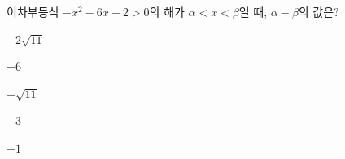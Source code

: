 이차부등식 $-x^2-6x+2>0$의 해가 $\alpha<x<\beta$일 때, $\alpha-\beta$의 값은?
\begin{choices32}{\rule[-3ex]{0pt}{8ex}$-2\sqrt{11}$}{\rule[-3ex]{0pt}{8ex}$-6$}{\rule[-3ex]{0pt}{8ex}$-\sqrt{11}$}{\rule[-3ex]{0pt}{8ex}$-3$}{\rule[-3ex]{0pt}{8ex}$-1$}\end{choices32}
